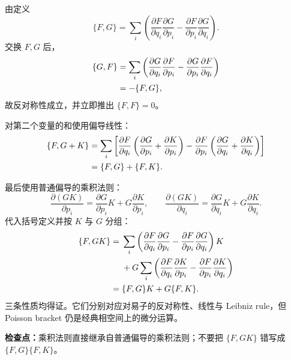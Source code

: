 \begin{checkedsolution}
由定义
\[
  \{F,G\}
  =\sum_i\left(
    \frac{\partial F}{\partial q_i}
    \frac{\partial G}{\partial p_i}
    -
    \frac{\partial F}{\partial p_i}
    \frac{\partial G}{\partial q_i}
  \right).
\]
交换 $F,G$ 后，
\begin{align}
  \{G,F\}
  &=\sum_i\left(
    \frac{\partial G}{\partial q_i}
    \frac{\partial F}{\partial p_i}
    -
    \frac{\partial G}{\partial p_i}
    \frac{\partial F}{\partial q_i}
  \right) \notag\\
  &=-\{F,G\},
\end{align}
故反对称性成立，并立即推出 $\{F,F\}=0$。

对第二个变量的和使用偏导线性：
\begin{align}
  \{F,G+K\}
  &=\sum_i\left[
    \frac{\partial F}{\partial q_i}
    \left(
      \frac{\partial G}{\partial p_i}
      +\frac{\partial K}{\partial p_i}
    \right)
    -
    \frac{\partial F}{\partial p_i}
    \left(
      \frac{\partial G}{\partial q_i}
      +\frac{\partial K}{\partial q_i}
    \right)
  \right] \notag\\
  &=\{F,G\}+\{F,K\}.
\end{align}

最后使用普通偏导的乘积法则：
\[
  \frac{\partial(GK)}{\partial p_i}
  =\frac{\partial G}{\partial p_i}K
   +G\frac{\partial K}{\partial p_i},
  \qquad
  \frac{\partial(GK)}{\partial q_i}
  =\frac{\partial G}{\partial q_i}K
   +G\frac{\partial K}{\partial q_i}.
\]
代入括号定义并按 $K$ 与 $G$ 分组：
\begin{align}
  \{F,GK\}
  ={}&
  \sum_i\left(
    \frac{\partial F}{\partial q_i}
    \frac{\partial G}{\partial p_i}
    -
    \frac{\partial F}{\partial p_i}
    \frac{\partial G}{\partial q_i}
  \right)K \notag\\
  &+G\sum_i\left(
    \frac{\partial F}{\partial q_i}
    \frac{\partial K}{\partial p_i}
    -
    \frac{\partial F}{\partial p_i}
    \frac{\partial K}{\partial q_i}
  \right) \notag\\
  ={}&\{F,G\}K+G\{F,K\}.
\end{align}
三条性质均得证。它们分别对应对易子的反对称性、线性与 Leibniz rule，但 Poisson bracket 仍是经典相空间上的微分运算。
\end{checkedsolution}

\textbf{检查点：}乘积法则直接继承自普通偏导的乘积法则；不要把 $\{F,GK\}$ 错写成 $\{F,G\}\{F,K\}$。


